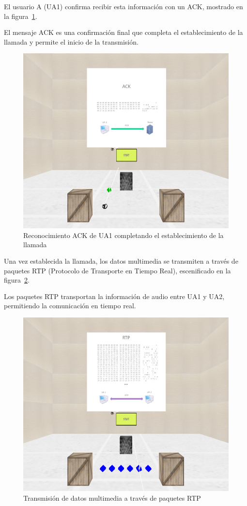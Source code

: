 \documentclass[a4paper, 12pt]{book}
\begin{document}
El usuario A (UA1) confirma recibir esta información con un ACK, mostrado en la figura~\ref{fig:10-ACK}. 

El mensaje ACK es una confirmación final que completa el establecimiento de la llamada y permite el inicio de la transmisión.

\bigskip

\begin{figure}[H]
  \centering
  \includegraphics[width=12cm, keepaspectratio]{img/resultados/13-ACK.PNG}
  \caption{Reconocimiento ACK de UA1 completando el establecimiento de la llamada}
  \label{fig:10-ACK}
\end{figure}
\clearpage

Una vez establecida la llamada, los datos multimedia se transmiten a través de 
paquetes RTP (Protocolo de Transporte en Tiempo Real), escenificado en la figura~\ref{fig:11-RTP}. 

Los paquetes RTP transportan la información de audio entre UA1 y UA2, permitiendo la comunicación en tiempo real.

\bigskip

\begin{figure}[H]
  \centering
  \includegraphics[width=12cm, keepaspectratio]{img/resultados/15-RTP.PNG}
  \caption{Transmisión de datos multimedia a través de paquetes RTP}
  \label{fig:11-RTP}
\end{figure}
\clearpage
\end{document}
